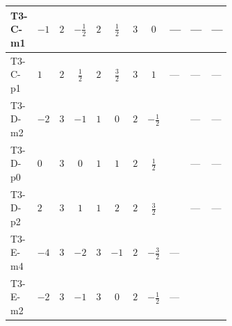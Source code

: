 \documentclass[8pt]{article}
\begin{document}
\begin{landscape}
\begin{longtable}{@{}llcccccc >{\raggedright\arraybackslash}p{0.21\linewidth} >{\raggedright\arraybackslash}p{0.21\linewidth} >{\raggedright\arraybackslash}p{0.21\linewidth}@{}}
\midrule
T3-C-m1 & $-1$ & $2$ & $-\frac{1}{2}$ & $2$ & $\frac{1}{2}$ & $3$ & $0$ & --- & --- & --- \\
\midrule
T3-C-p1 & $1$ & $2$ & $\frac{1}{2}$ & $2$ & $\frac{3}{2}$ & $3$ & $1$ & --- & --- & --- \\
\midrule
T3-D-m2 & $-2$ & $3$ & $-1$ & $1$ & $0$ & $2$ & $-\frac{1}{2}$ & \scriptsize\adjustbox{max width=\linewidth}{$\begin{gathered} {\lambda_{12}^{(1)}} (2 T_{\nu}^{(1)}+4 T_{\nu}^{(2)}+4 {\lambda_{S_1}^{(A)}})\end{gathered}$} & --- & --- \\
\midrule
T3-D-p0 & $0$ & $3$ & $0$ & $1$ & $1$ & $2$ & $\frac{1}{2}$ & \scriptsize\adjustbox{max width=\linewidth}{$\begin{gathered} {\lambda_{12}^{(1)}} (2 T_{\nu}^{(1)}+4 T_{\nu}^{(2)}+4 {\lambda_{S_1}^{(A)}})\end{gathered}$} & --- & --- \\
\midrule
T3-D-p2 & $2$ & $3$ & $1$ & $1$ & $2$ & $2$ & $\frac{3}{2}$ & \scriptsize\adjustbox{max width=\linewidth}{$\begin{gathered} {\lambda_{12}^{(1)}} (2 T_{\nu}^{(1)}+4 T_{\nu}^{(2)}+4 {\lambda_{S_1}^{(A)}})\end{gathered}$} & --- & --- \\
\midrule
T3-E-m4 & $-4$ & $3$ & $-2$ & $3$ & $-1$ & $2$ & $-\frac{3}{2}$ & --- & \scriptsize\adjustbox{max width=\linewidth}{$\begin{gathered} {\lambda_{12}^{(1)}} \left(2 T_{\nu}^{(1)}+2 T_{\nu}^{(2)}+\frac{16 {\lambda_{12}^{(\times)}}}{3}+4 {\lambda_{S_1}^{(A)}}+4 {\lambda_{S_2}^{(A)}}\right)\end{gathered}$} & \scriptsize\adjustbox{max width=\linewidth}{$\begin{gathered} +{\lambda_{12}^{(\times)}} \left(\frac{4}{3} T_{\nu}^{(1)}+\frac{4}{3} T_{\nu}^{(2)}\right)\end{gathered}$} \\
\midrule
T3-E-m2 & $-2$ & $3$ & $-1$ & $3$ & $0$ & $2$ & $-\frac{1}{2}$ & --- & \scriptsize\adjustbox{max width=\linewidth}{$\begin{gathered} {\lambda_{12}^{(1)}} \left(2 T_{\nu}^{(1)}+2 T_{\nu}^{(2)}+\frac{16 {\lambda_{12}^{(\times)}}}{3}+4 {\lambda_{S_1}^{(A)}}+4 {\lambda_{S_2}^{(A)}}\right)\end{gathered}$} & \scriptsize\adjustbox{max width=\linewidth}{$\begin{gathered} +{\lambda_{12}^{(\times)}} \left(\frac{4}{3} T_{\nu}^{(1)}+\frac{4}{3} T_{\nu}^{(2)}\right)\end{gathered}$} \\

\end{longtable}
\end{landscape}
\end{document}
